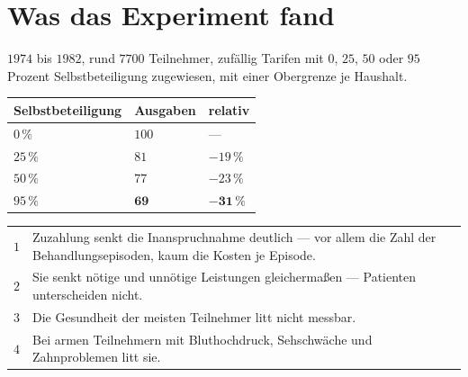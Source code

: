 \section{Was das Experiment fand}

\begin{merksatz}
$1974$ bis $1982$, rund $7700$ Teilnehmer, zufällig Tarifen mit $0$, $25$, $50$ oder $95$ Prozent Selbstbeteiligung zugewiesen, mit einer Obergrenze je Haushalt.

\begin{center}
{\small
\renewcommand{\arraystretch}{1.48}
\begin{tabular}{@{}P{3.0cm}P{2.2cm}P{2.2cm}@{}}
\toprule
\textbf{Selbstbeteiligung} & \textbf{Ausgaben} & \textbf{relativ}\\
\midrule
$0\,\%$ & $100$ & ---\\
$25\,\%$ & $81$ & $-19\,\%$\\
$50\,\%$ & $77$ & $-23\,\%$\\
$95\,\%$ & $\mathbf{69}$ & $\mathbf{-31\,\%}$\\
\bottomrule
\end{tabular}}
\end{center}

\begin{center}
{\small
\renewcommand{\arraystretch}{1.5}
\begin{tabular}{@{}P{1.0cm}P{7.4cm}@{}}
\toprule
$1$ & Zuzahlung senkt die Inanspruchnahme deutlich --- vor allem die Zahl der Behandlungsepisoden, kaum die Kosten je Episode.\\
$2$ & Sie senkt nötige und unnötige Leistungen gleichermaßen --- Patienten unterscheiden nicht.\\
$3$ & Die Gesundheit der meisten Teilnehmer litt nicht messbar.\\
$4$ & Bei armen Teilnehmern mit Bluthochdruck, Sehschwäche und Zahnproblemen litt sie.\\
\bottomrule
\end{tabular}}
\end{center}

\begin{center}
\begin{minipage}{0.88\textwidth}
\end{minipage}
\end{center}
\end{merksatz}

